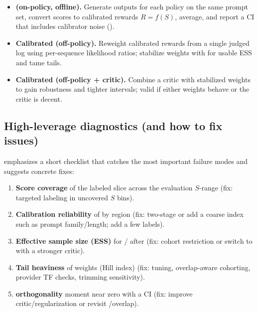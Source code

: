 \begin{itemize}
\item \textbf{\dm{} (on-policy, offline).} Generate outputs for each policy on the same prompt set, convert scores to calibrated rewards $R = f(S)$, average, and report a CI that includes calibrator noise (\oua).

\item \textbf{Calibrated \ips{} (off-policy).} Reweight calibrated rewards from a single judged log using per-sequence likelihood ratios; stabilize weights with \simcal{} for usable ESS and tame tails.

\item \textbf{Calibrated \dr{} (off-policy + critic).} Combine a critic with stabilized weights to gain robustness and tighter intervals; valid if either weights behave or the critic is decent.
\end{itemize}

\subsection{High-leverage diagnostics (and how to fix issues)}

\cje{} emphasizes a short checklist that catches the most important failure modes and suggests concrete fixes:

\begin{enumerate}[label=(\alph*)]
\item \textbf{Score coverage} of the labeled slice across the evaluation $S$-range (fix: targeted labeling in uncovered $S$ bins).

\item \textbf{Calibration reliability} of \autocal{} by region (fix: two-stage \autocal{} or add a coarse index such as prompt family/length; add a few labels).

\item \textbf{Effective sample size (ESS)} for \ips/\dr{} after \simcal{} (fix: cohort restriction or switch to \dr{} with a stronger critic).

\item \textbf{Tail heaviness} of weights (Hill index) (fix: \simcal{} tuning, overlap-aware cohorting, provider TF checks, trimming sensitivity).

\item \textbf{\dr{} orthogonality} moment near zero with a CI (fix: improve critic/regularization or revisit \simcal/overlap).
\end{enumerate}

